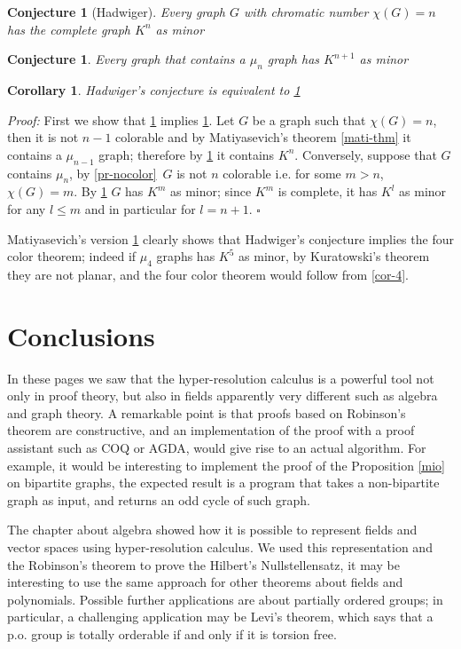 \documentclass[a4paper,12pt,oneside]{book}
\newtheorem{corollary}[theorem]{Corollary}
\newtheorem{conjecture}[theorem]{Conjecture}
\newcommand*{\QED}{\hfill\ensuremath{\square}}
\begin{document}
\begin{conjecture}[Hadwiger]\label{hadw}
Every graph $G$ with chromatic number $\chi (G)=n$ has the complete graph $K^n$  as minor \end{conjecture}

\begin{conjecture}\label{hadw_mu}
Every graph that contains a $\mu_n$ graph has $K^{n+1}$  as minor \end{conjecture}

\begin{corollary}
Hadwiger's conjecture is equivalent to \ref{hadw_mu}\end{corollary}
\textit{Proof:} First we show that \ref{hadw_mu} implies \ref{hadw}. Let $G$ be a graph such that $\chi (G)=n$, then it is not $n-1$ colorable and by Matiyasevich's theorem \ref{mati-thm} it contains a $\mu_{n-1}$ graph; therefore by \ref{hadw_mu} it contains $K^n$.
Conversely, suppose that $G$ contains $\mu_n$, by \ref{pr-nocolor} $\,G$ is not $n$ colorable i.e. for some $m>n$, $\chi (G)=m$. By \ref{hadw} $G$ has $K^m$ as minor; since $K^m$ is complete, it has $K^l$ as minor for any $l\leq m$ and in particular for $l=n+1$. \QED

\noindent Matiyasevich's version \ref{hadw_mu} clearly shows  that Hadwiger's conjecture implies the four color theorem; indeed if $\mu_4$ graphs has $K^5$ as minor, by Kuratowski's theorem they are not planar, and the four color theorem would follow from \ref{cor-4}.


\chapter*{Conclusions}

In these pages we saw that the hyper-resolution calculus is a powerful tool not only in proof theory, but also in fields apparently very different such as algebra and graph theory. 
A remarkable point is that proofs based on Robinson's theorem are constructive, and an implementation of the proof with a  proof assistant such as \textsc{COQ} or \textsc{AGDA}, would give rise to an actual algorithm. 
For example, it would be interesting to implement the proof of the Proposition \ref{mio} on bipartite graphs, the expected result is a program that takes a non-bipartite graph as input, and returns an odd cycle of such graph.

The chapter about algebra showed how it is possible to represent fields and vector spaces using hyper-resolution calculus. We used this representation and the Robinson's theorem to prove the Hilbert's Nullstellensatz, it may be interesting to use the same approach for other theorems about fields and polynomials.
Possible further applications are about partially ordered groups; in particular, a challenging application may be Levi's theorem, which says that a p.o. group is totally orderable if and only if it is torsion free\cite{fuchs}. 
\end{document}
